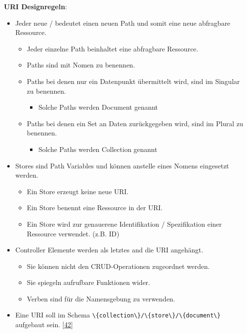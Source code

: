 \documentclass[
    headings=optiontotocandhead,%
    twoside,
    numbers=noenddot,%
    12pt, %
    titlepage, %
    parskip=full, %
    listof=leveldown, 
    numbers=noenddot, %
    a4paper,DIV=14,
    BCOR=15mm,
]{scrbook}
\newcommand{\passthrough}[1]{#1}
\providecommand{\tightlist}{%
  \setlength{\itemsep}{0pt}\setlength{\parskip}{0pt}}
\begin{document}
\textbf{URI Designregeln}:

\begin{itemize}
\tightlist
\item
  Jeder neue / bedeutet einen neuen Path und somit eine neue abfragbare
  Ressource.

  \begin{itemize}
  \tightlist
  \item
    Jeder einzelne Path beinhaltet eine abfragbare Ressource.
  \item
    Paths sind mit Nomen zu benennen.
  \item
    Paths bei denen nur ein Datenpunkt übermittelt wird, sind im
    Singular zu benennen.

    \begin{itemize}
    \tightlist
    \item
      Solche Paths werden Document genannt
    \end{itemize}
  \item
    Paths bei denen ein Set an Daten zurückgegeben wird, sind im Plural
    zu benennen.

    \begin{itemize}
    \tightlist
    \item
      Solche Paths werden Collection genannt
    \end{itemize}
  \end{itemize}
\item
  Stores sind Path Variables und können anstelle eines Nomens eingesetzt
  werden.

  \begin{itemize}
  \tightlist
  \item
    Ein Store erzeugt keine neue URI.
  \item
    Ein Store benennt eine Ressource in der URI.
  \item
    Ein Store wird zur genauerene Identifikation / Spezifikation einer
    Ressource verwendet. (z.B. ID)
  \end{itemize}
\item
  Controller Elemente werden als letztes and die URI angehängt.

  \begin{itemize}
  \tightlist
  \item
    Sie können nicht den CRUD-Operationen zugeordnet werden.
  \item
    Sie spiegeln aufrufbare Funktionen wider.
  \item
    Verben sind für die Namensgebung zu verwenden.
  \end{itemize}
\item
  Eine URI soll im Schema
  \passthrough{\lstinline!\{collection\}/\{store\}/\{document\}!}
  aufgebaut sein.
  {[}\protect\hyperlink{ref-REST-API-Design-Rulebook}{42}{]}
\end{itemize}
\end{document}
